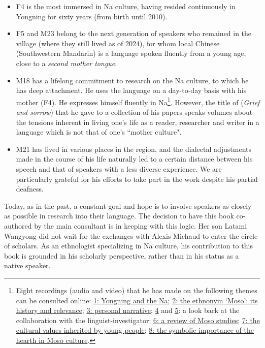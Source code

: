 \begin{itemize}
    \item F4 is the most immersed in Na culture, having resided continuously in Yongning for sixty years (from birth until 2010).
    \item F5 and M23 belong to the next generation of speakers who remained in the village (where they still lived as of 2024), for whom local Chinese (Southwestern Mandarin) is a language spoken fluently from a young age, close to a \emph{second mother tongue}.
    \item M18 has a lifelong commitment to research on the Na culture, to which he has deep attachment. He uses the language on a day-to-day basis with his mother (F4). He expresses himself fluently in Na\footnote{Eight recordings (audio and video) that he has made on the following themes can be consulted online:
    \href{https://doi.org/10.24397/pangloss-0007734}{1: Yongning and the Na}; \href{https://doi.org/10.24397/pangloss-0007740}{2: the ethnonym `Moso': its history and relevance}; \href{https://doi.org/10.24397/pangloss-0007730}{3: personal narrative}; \href{https://doi.org/10.24397/pangloss-0007736}{4} and \href{https://doi.org/10. 24397/pangloss-0007738}{5}: a look back at the collaboration with the linguist-investigator; \href{https://doi.org/10.24397/pangloss-0007742}{6: a review of Moso studies}; \href{https://doi.org/10.24397/pangloss-0007728}{7: the cultural values inherited by young people}; \href{https://doi.org/10.24397/pangloss-0007732}{8: the symbolic importance of the hearth in Moso culture}.}.
    However, the title of  (\emph{Grief and sorrow}) that he gave to a collection of his papers \parencite{latami2016} speaks volumes about the tensions inherent in living one's life as a reader, researcher and writer in a language which is not that of one's ``mother culture".
    \item M21 has lived in various places in the region, and the dialectal adjustments made in the course of his life naturally led to a certain distance between his speech and that of speakers with a less diverse experience. We are particularly grateful for his efforts to take part in the work despite his partial deafness.
\end{itemize}

Today, as in the past, a constant goal and hope is to involve speakers as closely as possible in research into their language. The decision to have this book co-authored by the main consultant is in keeping with this logic. Her son Latami Wangyong did not wait for the exchanges with Alexis Michaud to enter the circle of scholars. As an ethnologist specializing in Na culture, his contribution to this book is grounded in his scholarly perspective, rather than in his status as a native speaker.

